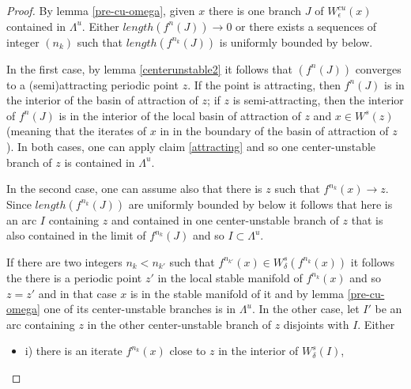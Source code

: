 \documentclass[a4paper,11pt]{article}
\theoremstyle{definition}
\def\La{\Lambda}
\def\e{\epsilon}
\def\de{\delta}
\def\La{\Lambda}
\begin{document}
\begin{proof}
    

By  lemma \ref{pre-cu-omega}, given $x$ there is one   branch $J$ of $W^{cu}_\e(x)$  contained in $\La^u$. Either $length(f^n(J))\to 0$ or there exists a sequences of integer $(n_k)$ such that $length(f^{n_k}(J))$ is uniformly bounded by below. 

In the first case, by lemma \ref{centerunstable2} it follows that $(f^n(J))$ converges to a (semi)attracting periodic point $z$. If the point is attracting, then $f^n(J)$ is in the interior of the basin of attraction of $z$; if $z$ is semi-attracting, then  the interior of  $f^n(J)$ is in the interior of the local  basin of attraction of $z$ and $x \in W^s(z)$ (meaning that the iterates of $x$ in in the boundary of the basin of attraction of $z$). In both cases, one can apply claim \ref{attracting} and so one center-unstable branch of $z$ is contained in $\La^u.$





 

In the second case, one can assume also that there is $z$  such that $f^{n_k}(x)\to z.$ Since $length(f^{n_k}(J))$ are uniformly bounded by below it follows that here is an arc $I$ containing $z$ and contained  in one center-unstable branch of $z$ that  is also  contained in the limit of $f^{n_k}(J)$ and so $I\subset \La^u.$ 

If there are two integers $n_k< n_{k'}$ such that  $f^{n_{k'}}(x)\in W^s_\de(f^{n_k}(x))$ it follows the there is a periodic point $z'$ in the local stable manifold of $f^{n_k}(x)$ and so $z=z'$  and in that case    $x$ is in the stable manifold of it and by lemma \ref{pre-cu-omega} one of its center-unstable branches is in $\La^u$. In the other case, let $I'$ be an arc containing $z$ in the other center-unstable branch of $z$ disjoints with $I.$ Either 

\begin{itemize}
    \item[--] i) there is an  iterate  $f^{n_k}(x)$ close to $z$  in the interior of $W^s_\de(I)$,


\end{itemize}
\end{proof}
\end{document}
